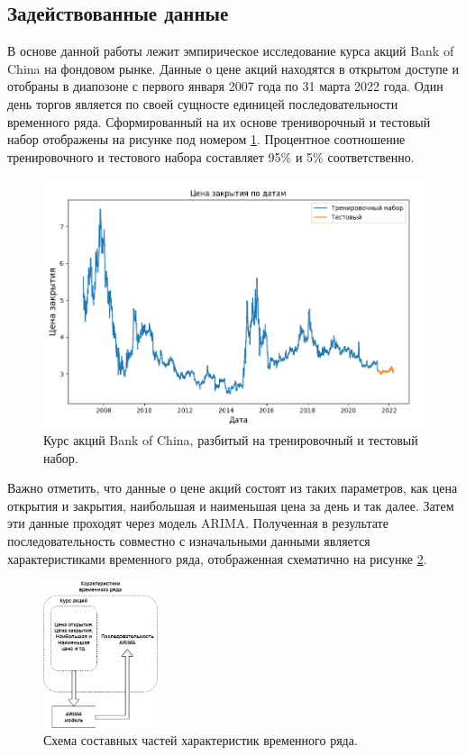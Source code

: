 \subsection{Задействованные данные}

\par В основе данной работы лежит эмпирическое исследование курса акций Bank of China на фондовом рынке. Данные о цене акций находятся в открытом доступе и отобраны в диапозоне с первого января 2007 года по 31 марта 2022 года. Один день торгов является по своей сущносте единицей последовательности временного ряда. Сформированный на их основе трениворочный и тестовый набор отображены на рисунке под номером \ref{fig:close-price}. Процентное соотношение тренировочного и тестового набора составляет 95\% и 5\% соответственно.

\begin{figure}[hbtp]
  \centering
  \includegraphics[width=\textwidth]{img/Close_price.png}
  \caption{Курс акций Bank of China, разбитый на тренировочный и тестовый набор.}
  \label{fig:close-price}
\end{figure}

\newpage

\par Важно отметить, что данные о цене акций состоят из таких параметров, как цена открытия и закрытия, наибольшая и наименьшая цена за день и так далее. Затем эти данные проходят через модель ARIMA. Полученная в результате последовательность совместно с изначальными данными является характеристиками временного ряда, отображенная схематично на рисунке \ref{fig:feature}. 

\begin{figure}[hbtp]
  \centering
  \includegraphics[width=0.3\textwidth]{img/features.png}
  \caption{Схема составных частей характеристик временного ряда.}
  \label{fig:feature}
\end{figure}

